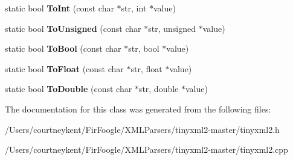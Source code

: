 \begin{DoxyCompactItemize}
\item 
\hypertarget{classtinyxml2_1_1_x_m_l_util_ad4df4023d11ee3fca9689c49b9707323}{static bool {\bfseries To\+Int} (const char $\ast$str, int $\ast$value)}\label{classtinyxml2_1_1_x_m_l_util_ad4df4023d11ee3fca9689c49b9707323}

\item 
\hypertarget{classtinyxml2_1_1_x_m_l_util_a210c8637d5eb4ce3d4625294af0efc2f}{static bool {\bfseries To\+Unsigned} (const char $\ast$str, unsigned $\ast$value)}\label{classtinyxml2_1_1_x_m_l_util_a210c8637d5eb4ce3d4625294af0efc2f}

\item 
\hypertarget{classtinyxml2_1_1_x_m_l_util_ae5b03e0a1ca5d42052a7ac540f7aa12a}{static bool {\bfseries To\+Bool} (const char $\ast$str, bool $\ast$value)}\label{classtinyxml2_1_1_x_m_l_util_ae5b03e0a1ca5d42052a7ac540f7aa12a}

\item 
\hypertarget{classtinyxml2_1_1_x_m_l_util_a399e71edb5f29d61ea81d91ee0332bb9}{static bool {\bfseries To\+Float} (const char $\ast$str, float $\ast$value)}\label{classtinyxml2_1_1_x_m_l_util_a399e71edb5f29d61ea81d91ee0332bb9}

\item 
\hypertarget{classtinyxml2_1_1_x_m_l_util_ad8f75ac140fb19c1c6e164a957c4cd53}{static bool {\bfseries To\+Double} (const char $\ast$str, double $\ast$value)}\label{classtinyxml2_1_1_x_m_l_util_ad8f75ac140fb19c1c6e164a957c4cd53}

\end{DoxyCompactItemize}


The documentation for this class was generated from the following files\+:\begin{DoxyCompactItemize}
\item 
/\+Users/courtneykent/\+Fir\+Foogle/\+X\+M\+L\+Parsers/tinyxml2-\/master/tinyxml2.\+h\item 
/\+Users/courtneykent/\+Fir\+Foogle/\+X\+M\+L\+Parsers/tinyxml2-\/master/tinyxml2.\+cpp\end{DoxyCompactItemize}
